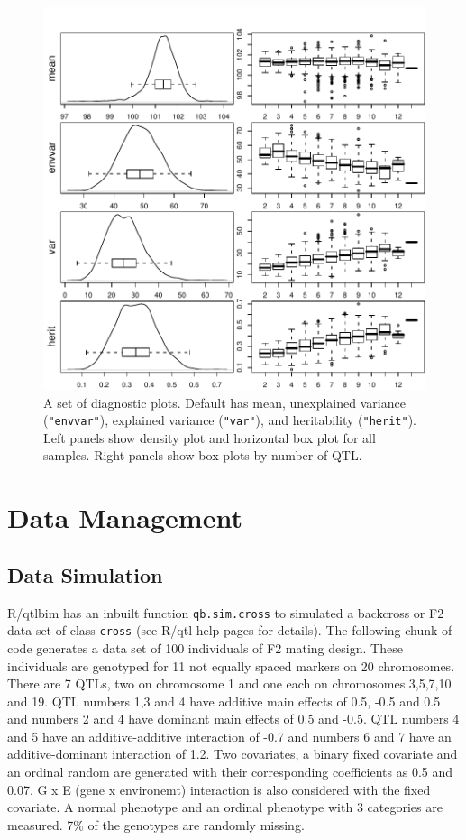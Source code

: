 \documentclass{article}
\begin{document}
\begin{figure}
\includegraphics{qtlbimPDF/FIG-QBDIAG}
\caption{A set of diagnostic plots. Default has mean, unexplained
variance (\texttt{"envvar"}), explained variance (\texttt{"var"}), and
heritability (\texttt{"herit"}). Left panels show density plot and
horizontal box plot for all samples. Right panels show box plots by
number of QTL.}
\label{figPlotQBDIAG}
\end{figure}

\section{Data Management}

\subsection{Data Simulation}

R/qtlbim has an inbuilt function {\tt qb.sim.cross} to simulated a
backcross or F2 data set of class {\tt cross} (see R/qtl help pages
for details). The following chunk of code generates a data set of
100 individuals of F2 mating design. These individuals are genotyped
for 11 not equally spaced markers on 20 chromosomes. There are 7 QTLs,
two on chromosome 1 and one each on chromosomes 3,5,7,10 and 19. QTL
numbers 1,3 and 4 have additive main effects of 0.5, -0.5 and 0.5 and
numbers 2 and 4 have dominant main effects of 0.5 and -0.5. QTL
numbers 4 and 5 have an additive-additive interaction of -0.7 and
numbers 6 and 7 have an additive-dominant interaction of 1.2. Two
covariates, a binary fixed covariate and an ordinal random are
generated with their corresponding coefficients as 0.5 and 0.07. G x E
(gene x environemt) interaction is also considered with the fixed
covariate. A normal phenotype and an ordinal phenotype with 3
categories are measured. 7\% of the genotypes are randomly missing.
\end{document}
